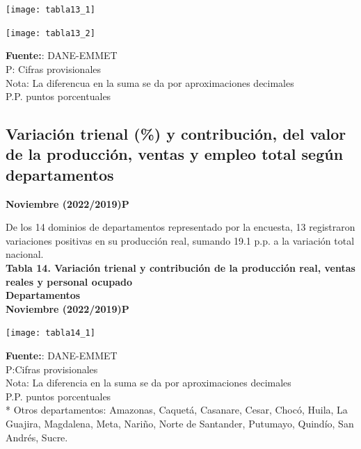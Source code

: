 \documentclass[
]{article}
\begin{document}
\begin{center}\texttt{[image: tabla13\_1]} \end{center}

\begin{center}\texttt{[image: tabla13\_2]} \end{center}

\textbf{Fuente:}: DANE-EMMET\\
P: Cifras provisionales\\
Nota: La diferencua en la suma se da por aproximaciones decimales\\
P.P. puntos porcentuales\\

\hypertarget{variaciuxf3n-trienal-y-contribuciuxf3n-del-valor-de-la-producciuxf3n-ventas-y-empleo-total-seguxfan-departamentos}{%
\subsection{Variación trienal (\%) y contribución, del valor de la
producción, ventas y empleo total según
departamentos}\label{variaciuxf3n-trienal-y-contribuciuxf3n-del-valor-de-la-producciuxf3n-ventas-y-empleo-total-seguxfan-departamentos}}

\textbf{Noviembre (2022/2019)P}

De los 14 dominios de departamentos representado por la encuesta, 13
registraron variaciones positivas en su producción real, sumando 19.1
p.p. a la variación total nacional.\\

\textbf{Tabla 14. Variación trienal y contribución de la producción real, ventas reales y personal ocupado}\\
\textbf{Departamentos}\\
\textbf{Noviembre (2022/2019)P}\\

\begin{center}\texttt{[image: tabla14\_1]} \end{center}

\textbf{Fuente:}: DANE-EMMET\\
P:Cifras provisionales\\
Nota: La diferencia en la suma se da por aproximaciones decimales\\
P.P. puntos porcentuales\\
* Otros departamentos: Amazonas, Caquetá, Casanare, Cesar, Chocó, Huila,
La Guajira, Magdalena, Meta, Nariño, Norte de Santander, Putumayo,
Quindío, San Andrés, Sucre.\\
\end{document}
